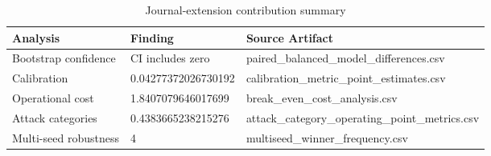 \begin{table}[htbp]
\centering
\caption{Journal-extension contribution summary}
\begin{tabular}{lll}
\hline
Analysis & Finding & Source Artifact \\
\hline
Bootstrap confidence & CI includes zero & paired\_balanced\_model\_differences.csv \\
Calibration & 0.04277372026730192 & calibration\_metric\_point\_estimates.csv \\
Operational cost & 1.8407079646017699 & break\_even\_cost\_analysis.csv \\
Attack categories & 0.4383665238215276 & attack\_category\_operating\_point\_metrics.csv \\
Multi-seed robustness & 4 & multiseed\_winner\_frequency.csv \\
\hline
\end{tabular}
\end{table}
